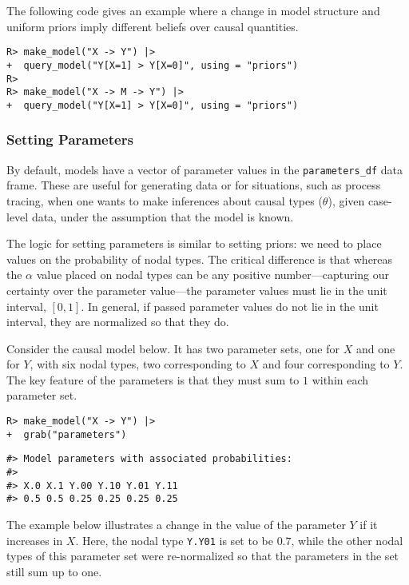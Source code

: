 \documentclass[
  11pt,
  article]{jss}
\begin{document}
The following code gives an example where a change in model structure
and uniform priors imply different beliefs over causal quantities.

\begin{verbatim}
R> make_model("X -> Y") |>
+  query_model("Y[X=1] > Y[X=0]", using = "priors")
R> 
R> make_model("X -> M -> Y") |>
+  query_model("Y[X=1] > Y[X=0]", using = "priors")
\end{verbatim}

\hypertarget{parameters}{%
\subsubsection{Setting Parameters}\label{parameters}}

By default, models have a vector of parameter values in the
\texttt{parameters\_df} data frame. These are useful for generating data
or for situations, such as process tracing, when one wants to make
inferences about causal types (\(\theta\)), given case-level data, under
the assumption that the model is known.

The logic for setting parameters is similar to setting priors: we need
to place values on the probability of nodal types. The critical
difference is that whereas the \(\alpha\) value placed on nodal types
can be any positive number---capturing our certainty over the parameter
value---the parameter values must lie in the unit interval, \([0,1]\).
In general, if passed parameter values do not lie in the unit interval,
they are normalized so that they do.

Consider the causal model below. It has two parameter sets, one for
\(X\) and one for \(Y\), with six nodal types, two corresponding to
\(X\) and four corresponding to \(Y\). The key feature of the parameters
is that they must sum to \(1\) within each parameter set.

\begin{verbatim}
R> make_model("X -> Y") |> 
+  grab("parameters")
\end{verbatim}

\begin{verbatim}
#> Model parameters with associated probabilities: 
#> 
#> X.0 X.1 Y.00 Y.10 Y.01 Y.11
#> 0.5 0.5 0.25 0.25 0.25 0.25
\end{verbatim}

The example below illustrates a change in the value of the parameter
\(Y\) if it increases in \(X\). Here, the nodal type \texttt{Y.Y01} is
set to be \(0.7\), while the other nodal types of this parameter set
were re-normalized so that the parameters in the set still sum up to
one.
\end{document}
